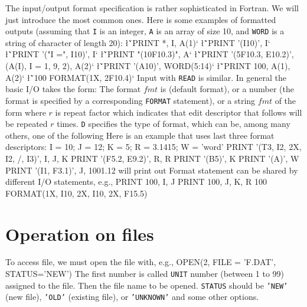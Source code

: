 {The input/output format specification is rather sophisticated in Fortran. 
We will just introduce the most common ones.   Here is some examples of
formatted outputs (assuming that {\tt I} is an integer, {\tt A} is an
array of size 10, and {\tt WORD} is a string of character of length 20):
\sms
\l{\v`PRINT *, I, A(1)`}
\l{\v`PRINT '(I10)', I`}
\l{\v`PRINT '("I =", I10)', I`}
\l{\v`PRINT "(10F10.3)", A`}
\l{\v`PRINT '(5F10.3, E10.2)', (A(I), I = 1, 9, 2), A(2)`}
\l{\v`PRINT '(A10)', WORD(5:14)`}
\l{\v`PRINT 100, A(1), A(2)`}
\l{\v`100 FORMAT(1X, 2F10.4)`}
\sms
Input with {\tt READ} is similar.  In general the basic I/O takes the form:
\sms
{}
\sms
The format $fmt$ is {\tt *} (default format), or a number
(the format is specified by a corresponding {\tt FORMAT} statement), or
a string $fmt$ of the form
\sms
{}
\sms
where $r$ is repeat factor which indicates that edit descriptor that
follows will be repeated $r$ times.  {\tt D} specifies the type of
format, which can be, among many others, one of the following
\sms
{}
\sms
Here is an example that uses last three format descriptors:
\ttbg
I = 10; J = 12; K = 5; R = 3.1415; W = 'word'
PRINT '(T3, I2, 2X, I2, /, I3)', I, J, K
PRINT '(F5.2, E9.2)', R, R
PRINT '(B5)', K
PRINT '(A)', W
PRINT '(I1, F3.1)', J, 1001.12
\tted
will print out
\sms
{}
\ll{****}
\sms
Format statement can be shared by different I/O statements, e.g.,
\ttbg
PRINT 100, I, J
PRINT 100, J, K, R
100 FORMAT(1X, I10, 2X, I10, 2X, F15.5)
\tted

\section{Operation on files}
To access file, we must open the file with, e.g.,
\ttbg
OPEN(2, FILE = 'F.DAT', STATUS='NEW')
\tted 
The first number is called {\tt UNIT} number (between 1 to 99) 
assigned to the file.   Then the file name to be opened.  {\tt STATUS} 
should be {\tt 'NEW'} (new file), {\tt 'OLD'} (existing file), or 
{\tt 'UNKNOWN'} and some other options.   

}
